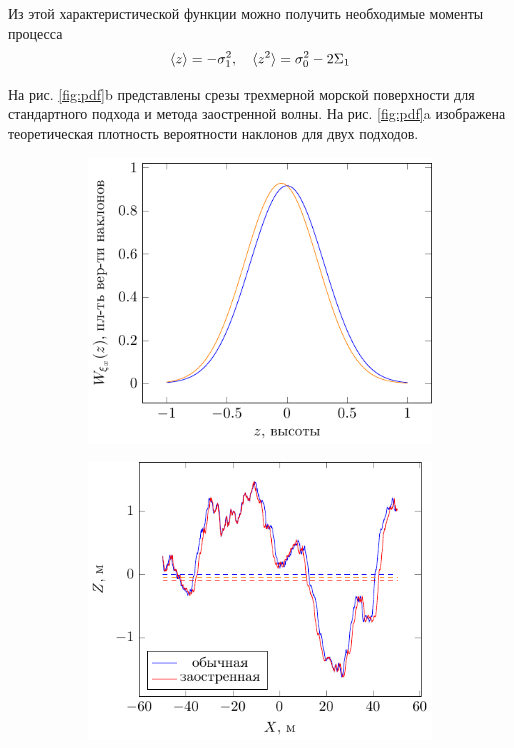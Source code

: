 Из этой характеристической функции можно получить необходимые моменты процесса
\begin{equation}
    \langle z\rangle = - \sigma_1^2, \quad \langle z^2\rangle = \sigma_0^2 - 2 \Sigma_1
\end{equation}
 
На рис. \ref{fig:pdf}b представлены срезы трехмерной морской поверхности 
для стандартного подхода и метода заостренной волны. На рис. \ref{fig:pdf}a
изображена теоретическая плотность вероятности наклонов для двух подходов. 

 \begin{figure}[h!]
    \centering
     \begin{subfigure}{0.49\linewidth}
        \centering
        \includegraphics[]{fig/water/pdf_cwm}
        \caption{}
    \end{subfigure}
    \hfill
     \begin{subfigure}{0.49\linewidth}
        \centering
        \includegraphics[]{fig/water/surface_cwm.pdf}

\end{subfigure}
\end{figure}

